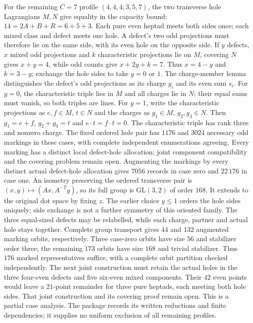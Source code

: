 For the remaining $C=7$ profile $(4,4,4;3,5,7)$, the two transverse
hole Lagrangians $M,N$ give equality in the capacity bound:
$14=2A+B+R=6+5+3$. Each pure even heptad meets both sides once;
each mixed class and defect meets one hole. A defect's two odd
projections must therefore lie on the same side, with its even hole
on the opposite side. If $y$ defects, $x$ mixed odd projections and
$k$ characteristic projections lie on $M$, covering $N$ gives
$x+y=4$, while odd counts give $x+2y+k=7$. Thus $x=4-y$ and
$k=3-y$; exchange the hole sides to take $y=0$ or $1$.
The charge-member lemma distinguishes the defect's odd projections
as its charge $g_i$ and its even sum $s_i$.
For $y=0$, the characteristic triple lies in $M$ and all charges
lie in $N$; their equal sums must vanish, so both triples are lines.
For $y=1$, write the characteristic projections as $e,f\in M$,
$t\in N$ and the charges as $g_1\in M$, $g_2,g_3\in N$.
Then $g_1=e+f$, $g_2+g_3=t$ and $e\cdot t=f\cdot t=0$.
The characteristic triple has rank three and nonzero charge.
The fixed ordered hole pair has $1176$ and $3024$ necessary odd
markings in these cases, with complete independent enumerations
agreeing. Every marking has a distinct local defect-hole allocation;
joint component compatibility and the covering problem remain open.
Augmenting the markings by every distinct actual defect-hole
allocation gives $7056$ records in case zero and $22\,176$ in
case one. An isometry preserving the ordered transverse pair is
$(x,y)\mapsto(Ax,A^{-T}y)$, so its full group is
$\mathrm{GL}(3,2)$ of order $168$. It extends to the original
dot space by fixing $z$. The earlier choice $y\leq1$ orders the
hole sides uniquely; side exchange is not a further symmetry
of this oriented family. The three equal-sized defects may be
relabelled, while each charge, partner and actual hole stays together.
Complete group transport gives $44$ and $132$ augmented marking
orbits, respectively. Three case-zero orbits have size $56$ and
stabilizer order three; the remaining $173$ orbits have size $168$
and trivial stabilizer. Thus $176$ marked representatives suffice,
with a complete orbit partition checked independently. The next
joint construction must retain the actual holes in the three
four-even defects and five six-even mixed components. Their
$42$ even points would leave a $21$-point remainder for three
pure heptads, each meeting both hole sides. That joint construction
and its covering proof remain open.
This is a partial case analysis.
The package records its written reductions and finite dependencies;
it supplies no uniform exclusion of all remaining profiles.

